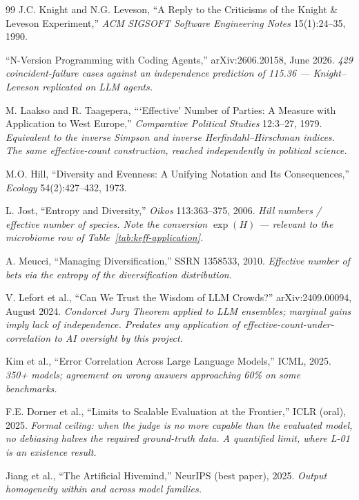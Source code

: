 \documentclass[11pt,a4paper]{article}
\theoremstyle{definition}
\theoremstyle{remark}
\begin{document}
\begin{thebibliography}{99}
J.C. Knight and N.G. Leveson, ``A Reply to the Criticisms of the Knight \& Leveson Experiment,'' \textit{ACM SIGSOFT Software Engineering Notes} 15(1):24--35, 1990.

``N-Version Programming with Coding Agents,'' arXiv:2606.20158, June 2026.
\textit{429 coincident-failure cases against an independence prediction of 115.36 --- Knight--Leveson replicated on LLM agents.}

M. Laakso and R. Taagepera, ```Effective' Number of Parties: A Measure with Application to West Europe,'' \textit{Comparative Political Studies} 12:3--27, 1979.
\textit{Equivalent to the inverse Simpson and inverse Herfindahl--Hirschman indices. The same effective-count construction, reached independently in political science.}

M.O. Hill, ``Diversity and Evenness: A Unifying Notation and Its Consequences,'' \textit{Ecology} 54(2):427--432, 1973.

L. Jost, ``Entropy and Diversity,'' \textit{Oikos} 113:363--375, 2006.
\textit{Hill numbers / effective number of species. Note the conversion $\exp(H)$ --- relevant to the microbiome row of Table~\ref{tab:keff-application}.}

A. Meucci, ``Managing Diversification,'' SSRN 1358533, 2010.
\textit{Effective number of bets via the entropy of the diversification distribution.}

V. Lefort et al., ``Can We Trust the Wisdom of LLM Crowds?'' arXiv:2409.00094, August 2024.
\textit{Condorcet Jury Theorem applied to LLM ensembles; marginal gains imply lack of independence. Predates any application of effective-count-under-correlation to AI oversight by this project.}

Kim et al., ``Error Correlation Across Large Language Models,'' ICML, 2025.
\textit{350+ models; agreement on wrong answers approaching 60\% on some benchmarks.}

F.E. Dorner et al., ``Limits to Scalable Evaluation at the Frontier,'' ICLR (oral), 2025.
\textit{Formal ceiling: when the judge is no more capable than the evaluated model, no debiasing halves the required ground-truth data. A quantified limit, where L-01 is an existence result.}

Jiang et al., ``The Artificial Hivemind,'' NeurIPS (best paper), 2025.
\textit{Output homogeneity within and across model families.}


\end{thebibliography}
\end{document}
